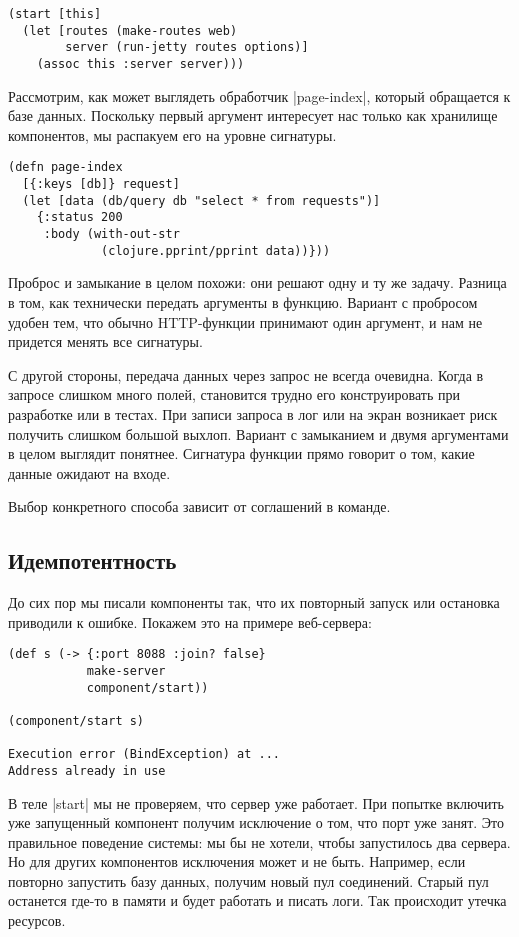 \begin{verbatim}
(start [this]
  (let [routes (make-routes web)
        server (run-jetty routes options)]
    (assoc this :server server)))
\end{verbatim}

Рассмотрим, как может выглядеть обработчик \spverb|page-index|, который обращается к
базе данных. Поскольку первый аргумент интересует нас только как хранилище
компонентов, мы распакуем его на уровне сигнатуры.

\begin{verbatim}
(defn page-index
  [{:keys [db]} request]
  (let [data (db/query db "select * from requests")]
    {:status 200
     :body (with-out-str
             (clojure.pprint/pprint data))}))
\end{verbatim}

Проброс и замыкание в целом похожи: они решают одну и ту же задачу. Разница в
том, как технически передать аргументы в функцию. Вариант с пробросом удобен
тем, что обычно HTTP-функции принимают один аргумент, и нам не придется менять
все сигнатуры.

С другой стороны, передача данных через запрос не всегда очевидна. Когда в
запросе слишком много полей, становится трудно его конструировать при разработке
или в тестах. При записи запроса в лог или на экран возникает риск получить
слишком большой выхлоп. Вариант с замыканием и двумя аргументами в целом
выглядит понятнее. Сигнатура функции прямо говорит о том, какие данные ожидают
на входе.

Выбор конкретного способа зависит от соглашений в команде.

\subsection{Идемпотентность}

До сих пор мы писали компоненты так, что их повторный запуск или остановка
приводили к ошибке. Покажем это на примере веб-сервера:

\begin{verbatim}
(def s (-> {:port 8088 :join? false}
           make-server
           component/start))

(component/start s)

Execution error (BindException) at ...
Address already in use
\end{verbatim}


В теле \spverb|start| мы не проверяем, что сервер уже работает. При попытке включить
уже запущенный компонент получим исключение о том, что порт уже занят. Это
правильное поведение системы: мы бы не хотели, чтобы запустилось два сервера. Но
для других компонентов исключения может и не быть. Например, если повторно
запустить базу данных, получим новый пул соединений. Старый пул останется где-то
в памяти и будет работать и писать логи. Так происходит утечка ресурсов.

